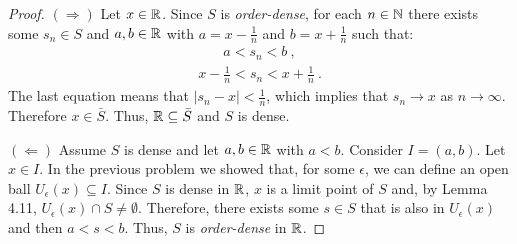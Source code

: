 \begin{questions}


\begin{solution}
  \begin{proof}
  $(\Rightarrow)$  Let $x\in\mathbb{R}$. Since $S$ is \textit{order-dense}, for each $n\in\mathbb{N}$ there exists some $s_n\in S$ and $a,b\in\mathbb{R}$ with $a=x-\frac{1}{n}$ and $b=x+\frac{1}{n}$ such that:
  \begin{align*}
  a<s_n<b~,
  \end{align*}
  \begin{align*}
  x-\frac{1}{n}<s_n<x+\frac{1}{n}~.
  \end{align*}
  The last equation means that $\left|s_n-x\right|<\frac{1}{n}$, which implies that $s_n\rightarrow x$ as $n\rightarrow\infty$. Therefore $x\in\bar{S}$. Thus, $\mathbb{R}\subseteq\bar{S}$ and $S$ is dense.
  
  $(\Leftarrow)$ Assume $S$ is dense and let $a,b\in\mathbb{R}$ with $a<b$. Consider $I=(a,b)$. Let $x\in I$. In the previous problem we showed that, for some $\epsilon$, we can define an open ball $U_{\epsilon}(x)\subseteq I$. Since $S$ is dense in $\mathbb{R}$, $x$ is a limit point of $S$ and, by Lemma 4.11, $U_{\epsilon}(x)\cap S\neq\emptyset$. Therefore, there exists some $s\in S$ that is also in $U_{\epsilon}(x)$ and then $a<s<b$. Thus, $S$ is \textit{order-dense} in $\mathbb{R}$.
  \end{proof}
\end{solution}


\end{questions}